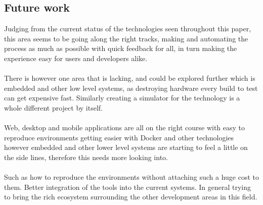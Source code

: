 \subsection{Future work}

Judging from the current status of the technologies seen throughout this paper, this area seems to be going along the right tracks, making and automating the process as much as possible with quick feedback for all, in turn making the experience easy for users and developers alike.
\\\\
There is however one area that is lacking, and could be explored further which is embedded and other low level systems, as destroying hardware every build to test can get expensive fast. Similarly creating a simulator for the technology is a whole different project by itself. 
\\\\
Web, desktop and mobile applications are all on the right course with easy to reproduce environments getting easier with Docker and other technologies however embedded and other lower level systems are starting to feel a little on the side lines, therefore this needs more looking into. 
\\\\
Such as how to reproduce the environments without attaching such a huge cost to them. Better integration of the tools into the current systems. In general trying to bring the rich ecosystem surrounding the other development areas in this field.